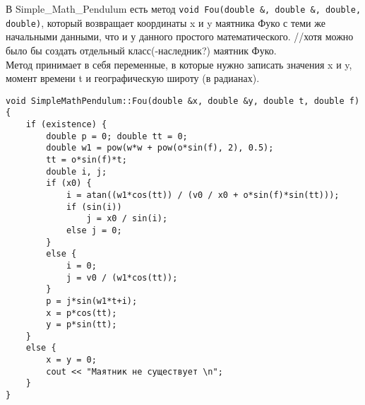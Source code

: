 \documentclass {report}
\begin{document}
В Simple\_Math\_Pendulum есть метод \texttt{void Fou(double \&, double \&, double, double)}, который возвращает координаты x и y маятника Фуко с теми же начальными данными, что и у данного простого математического. //хотя можно было бы создать отдельный класс(-наследник?) маятник Фуко. \\
Метод принимает в себя переменные, в которые нужно записать значения x и y, момент времени t и географическую широту (в радианах).
\begin{lstlisting}[caption = Координаты маятника Фуко]
void SimpleMathPendulum::Fou(double &x, double &y, double t, double f) {
	if (existence) {
		double p = 0; double tt = 0;
		double w1 = pow(w*w + pow(o*sin(f), 2), 0.5);
		tt = o*sin(f)*t;
		double i, j;
		if (x0) {
			i = atan((w1*cos(tt)) / (v0 / x0 + o*sin(f)*sin(tt)));
			if (sin(i))
				j = x0 / sin(i);
			else j = 0;
		}
		else {
			i = 0;
			j = v0 / (w1*cos(tt));
		}
		p = j*sin(w1*t+i);
		x = p*cos(tt);
		y = p*sin(tt);
	}
	else {
		x = y = 0;
		cout << "Маятник не существует \n";
	}
}
\end{lstlisting}
\end{document}
